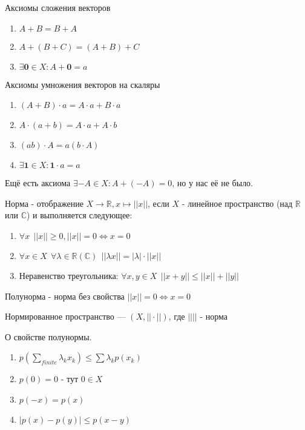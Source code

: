 Аксиомы сложения векторов
\begin{enumerate}\itemsep0em
    \item $A+B=B+A$
    \item $A+(B+C)=(A+B)+C$
    \item $\exists \bm 0 \in X : A+\bm 0 = a$
\end{enumerate}

Аксиомы умножения векторов на скаляры
\begin{enumerate}\itemsep0em
    \item $(A+B)\cdot a = A\cdot a + B\cdot a$
    \item $A\cdot(a+b) = A\cdot a + A\cdot b$
    \item $(ab)\cdot A = a(b\cdot A)$
    \item $\exists \bm 1 \in X : \bm 1 \cdot a = a$
\end{enumerate}

Ещё есть аксиома $\exists -A\in X : A+(-A)=0$, но у нас её не было.

\begin{definition}
Норма - отображение $X\to\mathbb{R}, x\mapsto ||x||$, если $X$ - линейное пространство (над $\mathbb{R}$ или $\mathbb{C}$) и выполняется следующее:
\begin{enumerate}
\item $\forall x \ \ ||x||\geq 0, ||x||=0\Leftrightarrow x=0$
\item $\forall x\in X \ \ \forall \lambda\in\mathbb R(\mathbb{C}) \ \ ||\lambda x||=|\lambda|\cdot||x||$
\item Неравенство треугольника: $\forall x,y\in X \ \ ||x+y||\leq||x||+||y||$
\end{enumerate}
\end{definition}

\begin{definition}
Полунорма - норма без свойства $||x||=0\Leftrightarrow x=0$
\end{definition}

\begin{definition}
Нормированное пространство --- $(X, ||\cdot||)$, где $||||$ - норма
\end{definition}

\begin{lemma}
О свойстве полунормы.
\begin{enumerate}
\item $p(\sum\limits_{finite}\lambda_kx_k)\leq\sum\lambda_kp(x_k)$
\item $p(0)=0$ - тут $0\in X$
\item $p(-x)=p(x)$
\item $|p(x)-p(y)|\leq p(x-y)$
\end{enumerate}
\end{lemma}

